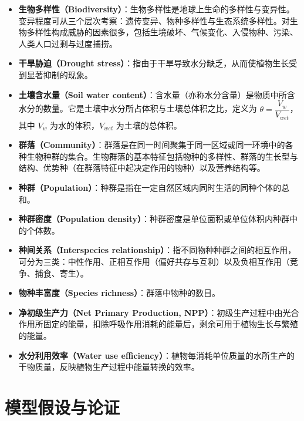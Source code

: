 \documentclass[11pt,a4paper]{ctexart}
\begin{document}
\begin{itemize}
\item \textbf{生物多样性（Biodiversity）}：生物多样性是地球上生命的多样性与变异性。变异程度可从三个层次考察：遗传变异、物种多样性与生态系统多样性。对生物多样性构成威胁的因素很多，包括生境破坏、气候变化、入侵物种、污染、人类人口过剩与过度捕捞\cite{ref2}。
\item \textbf{干旱胁迫（Drought stress）}：指由于干旱导致水分缺乏，从而使植物生长受到显著抑制的现象。
\item \textbf{土壤含水量（Soil water content）}：含水量（亦称水分含量）是物质中所含水分的数量。它是土壤中水分所占体积与土壤总体积之比，定义为 $\theta=\dfrac{V_w}{V_{wet}}$，其中 $V_w$ 为水的体积，$V_{wet}$ 为土壤的总体积。
\item \textbf{群落（Community）}：群落是在同一时间聚集于同一区域或同一环境中的各种生物种群的集合。生物群落的基本特征包括物种的多样性、群落的生长型与结构、优势种（在群落特征中起决定作用的物种）以及营养结构等。
\item \textbf{种群（Population）}：种群是指在一定自然区域内同时生活的同种个体的总和。
\item \textbf{种群密度（Population density）}：种群密度是单位面积或单位体积内种群中的个体数。
\item \textbf{种间关系（Interspecies relationship）}：指不同物种种群之间的相互作用，可分为三类：中性作用、正相互作用（偏好共存与互利）以及负相互作用（竞争、捕食、寄生）。
\item \textbf{物种丰富度（Species richness）}：群落中物种的数目。
\item \textbf{净初级生产力（Net Primary Production, NPP）}：初级生产过程中由光合作用所固定的能量，扣除呼吸作用消耗的能量后，剩余可用于植物生长与繁殖的能量。
\item \textbf{水分利用效率（Water use efficiency）}：植物每消耗单位质量的水所生产的干物质量，反映植物生产过程中能量转换的效率。
\end{itemize}
\section{模型假设与论证}
\end{document}

